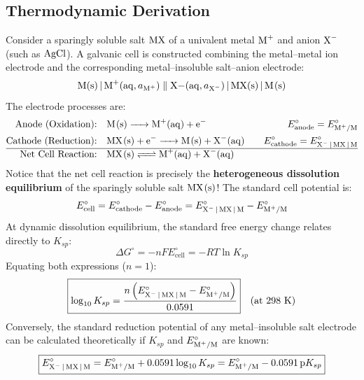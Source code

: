 \subsection{Thermodynamic Derivation}
Consider a sparingly soluble salt $\ce{MX}$ of a univalent metal $\ce{M+}$ and anion $\ce{X-}$ (such as $\ce{AgCl}$). A galvanic cell is constructed combining the metal--metal ion electrode and the corresponding metal--insoluble salt--anion electrode:
\begin{equation}
    \ce{M(s) | M+(aq, } a_{\ce{M+}}\ce{)} \parallel \ce{X-(aq, } a_{\ce{X-}}\ce{) | MX(s) | M(s)}
\end{equation}
The electrode processes are:
\begin{align}
    \text{Anode (Oxidation):} \quad & \ce{M(s) -> M+(aq) + e^-} \quad & E^\circ_{\text{anode}} = E^\circ_{\ce{M+/M}} \\
    \text{Cathode (Reduction):} \quad & \ce{MX(s) + e^- -> M(s) + X-(aq)} \quad & E^\circ_{\text{cathode}} = E^\circ_{\ce{X- | MX | M}} \\
    \hline
    \text{Net Cell Reaction:} \quad & \ce{MX(s) <=> M+(aq) + X-(aq)} &
\end{align}
Notice that the net cell reaction is precisely the \textbf{heterogeneous dissolution equilibrium} of the sparingly soluble salt $\ce{MX(s)}$!
The standard cell potential is:
\begin{equation}
    E^\circ_{\text{cell}} = E^\circ_{\text{cathode}} - E^\circ_{\text{anode}} = E^\circ_{\ce{X- | MX | M}} - E^\circ_{\ce{M+/M}}
\end{equation}
At dynamic dissolution equilibrium, the standard free energy change relates directly to $K_{sp}$:
\begin{equation}
    \Delta G^\circ = -n F E^\circ_{\text{cell}} = -RT \ln K_{sp}
\end{equation}
Equating both expressions ($n = 1$):
\begin{equation}
    \boxed{\log_{10} K_{sp} = \frac{n \left( E^\circ_{\ce{X- | MX | M}} - E^\circ_{\ce{M+/M}} \right)}{0.0591}} \quad (\text{at } 298\text{ K})
\end{equation}
Conversely, the standard reduction potential of any metal--insoluble salt electrode can be calculated theoretically if $K_{sp}$ and $E^\circ_{\ce{M+/M}}$ are known:
\begin{equation}
    \boxed{E^\circ_{\ce{X- | MX | M}} = E^\circ_{\ce{M+/M}} + 0.0591 \log_{10} K_{sp} = E^\circ_{\ce{M+/M}} - 0.0591\, \text{p}K_{sp}}
\end{equation}

